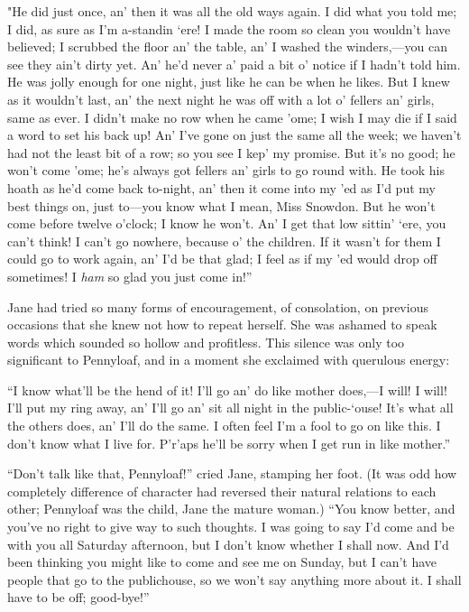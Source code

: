 "He did just once, an' then it was all the old ways again. I did what
you told me; I did, as sure as I'm a-standin `ere! I made the room so
clean you wouldn't have {\protect\hypertarget{29}{}{}}believed; I
scrubbed the floor an' the table, an' I washed the winders,---you can
see they ain't dirty yet. An' he'd never a' paid a bit o' notice if I
hadn't told him. He was jolly enough for one night, just like he can be
when he likes. But I knew as it wouldn't last, an' the next night he was
off with a lot o' fellers an' girls, same as ever. I didn't make no row
when he came 'ome; I wish I may die if I said a word to set his back up!
An' I've gone on just the same all the week; we haven't had not the
least bit of a row; so you see I kep' my promise. But it's no good; he
won't come 'ome; he's always got fellers an' girls to go round with. He
took his hoath as he'd come back to-night, an' then it come into my 'ed
as I'd put my best things on, just to---you know what I mean, Miss
Snowdon. But he won't come before twelve o'clock; I know he won't. An' I
get that low sittin' `ere, you can't think! I can't go nowhere, because
o' the children. If it wasn't for them I could go to work again, an' I'd
be that glad; I feel as if my 'ed would
{\protect\hypertarget{30}{}{}}drop off sometimes! I \emph{ham} so glad
you just come in!''

Jane had tried so many forms of encouragement, of consolation, on
previous occasions that she knew not how to repeat herself. She was
ashamed to speak words which sounded so hollow and profitless. This
silence was only too significant to Pennyloaf, and in a moment she
exclaimed with querulous energy:

``I know what'll be the hend of it! I'll go an' do like mother does,---I
will! I will! I'll put my ring away, an' I'll go an' sit all night in
the public-`ouse! It's what all the others does, an' I'll do the same. I
often feel I'm a fool to go on like this. I don't know what I live for.
P'r'aps he'll be sorry when I get run in like mother.''

``Don't talk like that, Pennyloaf!'' cried Jane, stamping her foot. (It
was odd how completely difference of character had reversed their
natural relations to each other; Pennyloaf was the child, Jane the
mature woman.) ``You know better, and you've no
{\protect\hypertarget{31}{}{}}right to give way to such thoughts. I was
going to say I'd come and be with you all Saturday afternoon, but I
don't know whether I shall now. And I'd been thinking you might like to
come and see me on Sunday, but I can't have people that go to the
publichouse, so we won't say anything more about it. I shall have to be
off; good-bye!''

